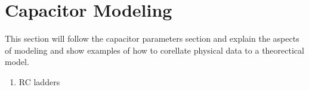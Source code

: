 \section {Capacitor Modeling}

This section will follow the capacitor parameters section and explain the aspects of modeling and show examples of how to corellate physical data to a theorectical model.  


\begin {enumerate}
    \item RC ladders
\end {enumerate}
